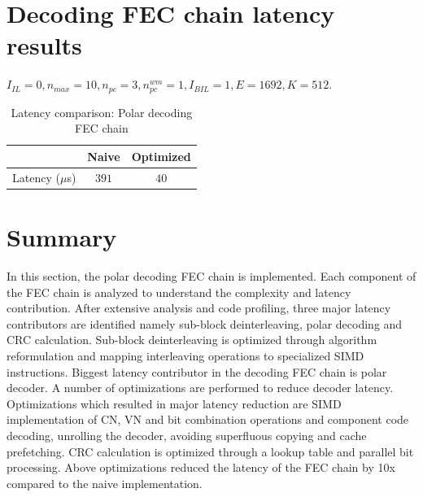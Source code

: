 \section{Decoding FEC chain latency results}

$I_{IL} = 0, n_{max} = 10, n_{pc} = 3 ,n_{pc}^{wm} = 1, I_{BIL} = 1, E = 1692, K = 512$.
\begin{table}[!h]
	\begin{center}
		\caption{Latency comparison: Polar decoding FEC chain}
		\label{tab:decodingFECChainLatency}
		\begin{tabular}{c|c|c} %
			\textbf{ } & Naive & Optimized \\
			\hline
			Latency ($\mu$s) & $391$ & $40$\\
		\end{tabular}
	\end{center}
\end{table}

\section{Summary}
In this section, the polar decoding FEC chain is implemented. Each component of the FEC chain is analyzed to understand the complexity and latency contribution. After extensive analysis and code profiling, three major latency contributors are identified namely sub-block deinterleaving, polar decoding and CRC calculation. Sub-block deinterleaving is optimized through algorithm reformulation and mapping interleaving operations to specialized SIMD instructions. Biggest latency contributor in the decoding FEC chain is polar decoder. A number of optimizations are performed to reduce decoder latency. Optimizations which resulted in major latency reduction are SIMD implementation of CN, VN and bit combination operations and component code decoding, unrolling the decoder, avoiding superfluous copying and cache prefetching. CRC calculation is optimized through a lookup table and parallel bit processing. Above optimizations reduced the latency of the FEC chain by 10x compared to the naive implementation.
